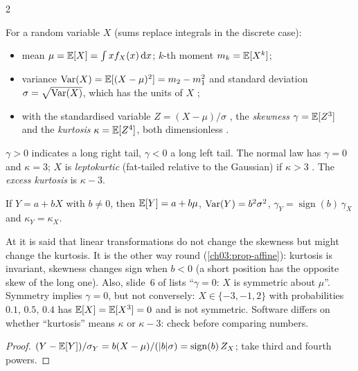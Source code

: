 \begin{paracol}{2}
\begin{definition}\label{ch03:def-moments}
For a random variable $X$ (sums replace integrals in the discrete case):
\begin{itemize}
  \item mean $\mu=\mathbb{E}[X]=\int x f_X(x)\,\mathrm{d} x$; $k$-th moment $m_k=\mathbb{E}[X^k]$;
  \item variance $\operatorname{Var}(X)=\mathbb{E}[(X-\mu)^2]=m_2-m_1^2$ and standard deviation $\sigma=\sqrt{\operatorname{Var}(X)}$, which has the
        units of $X$ ;
  \item with the standardised variable $Z=(X-\mu)/\sigma$ , the \emph{skewness}
        $\gamma=\mathbb{E}[Z^3]$ and the \emph{kurtosis} $\kappa=\mathbb{E}[Z^4]$, both dimensionless .
\end{itemize}
$\gamma>0$ indicates a long right tail, $\gamma<0$ a long left tail. The normal law has $\gamma=0$ and
$\kappa=3$; $X$ is \emph{leptokurtic} (fat-tailed relative to the Gaussian) if $\kappa>3$
. The \emph{excess kurtosis} is $\kappa-3$.
\end{definition}

\begin{proposition}\label{ch03:prop-affine}
If $Y=a+bX$ with $b\neq0$, then $\mathbb{E}[Y]=a+b\mu$, $\operatorname{Var}(Y)=b^2\sigma^2$, $\gamma_Y=\operatorname{sign}(b)\,\gamma_X$
and $\kappa_Y=\kappa_X$.\begin{coursenote}
At  it is said that linear transformations do not change the skewness but might change
the kurtosis. It is the other way round (\cref{ch03:prop-affine}): kurtosis is invariant, skewness
changes sign when $b<0$ (a short position has the opposite skew of the long one). Also, slide~6 of
 lists ``$\gamma=0$: $X$ is symmetric about $\mu$''. Symmetry implies $\gamma=0$, but not
conversely: $X\in\{-3,-1,2\}$ with probabilities $0.1,\,0.5,\,0.4$ has $\mathbb{E}[X]=\mathbb{E}[X^3]=0$ and is not symmetric.
Software differs on whether ``kurtosis'' means $\kappa$ or $\kappa-3$: check before comparing numbers.
\end{coursenote}
\end{proposition}
\begin{proof}
$(Y-\mathbb{E}[Y])/\sigma_Y=b(X-\mu)/(|b|\sigma)=\operatorname{sign}(b)\,Z_X$; take third and fourth powers.
\end{proof}


\end{paracol}
